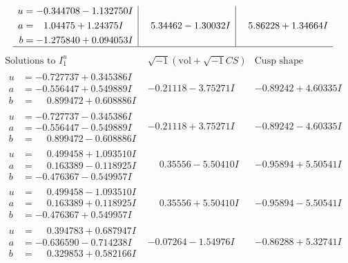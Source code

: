 \documentclass[1p]{elsarticle_modified}
\theoremstyle{definition}
\newcommand{\I}{\sqrt{-1}}
\begin{document}
$$\begin{array}{c|c|c}
\begin{aligned}
u &= -0.344708 - 1.132750 I \\
a &= \phantom{-}1.04475 + 1.24375 I \\
b &= -1.275840 + 0.094053 I\end{aligned}
 & \phantom{-}5.34462 - 1.30032 I & \phantom{-}5.86228 + 1.34664 I\\
 \hline 
 \end{array}$$\newpage$$\begin{array}{c|c|c}  
\text{Solutions to }I^u_{1}& \I (\text{vol} + \sqrt{-1}CS) & \text{Cusp shape}\\
 \hline 
\begin{aligned}
u &= -0.727737 + 0.345386 I \\
a &= -0.556447 + 0.549889 I \\
b &= \phantom{-}0.899472 + 0.608886 I\end{aligned}
 & -0.21118 - 3.75271 I & -0.89242 + 4.60335 I \\ \hline\begin{aligned}
u &= -0.727737 - 0.345386 I \\
a &= -0.556447 - 0.549889 I \\
b &= \phantom{-}0.899472 - 0.608886 I\end{aligned}
 & -0.21118 + 3.75271 I & -0.89242 - 4.60335 I \\ \hline\begin{aligned}
u &= \phantom{-}0.499458 + 1.093510 I \\
a &= \phantom{-}0.163389 - 0.118925 I \\
b &= -0.476367 - 0.549957 I\end{aligned}
 & \phantom{-}0.35556 - 5.50410 I & -0.95894 + 5.50541 I \\ \hline\begin{aligned}
u &= \phantom{-}0.499458 - 1.093510 I \\
a &= \phantom{-}0.163389 + 0.118925 I \\
b &= -0.476367 + 0.549957 I\end{aligned}
 & \phantom{-}0.35556 + 5.50410 I & -0.95894 - 5.50541 I \\ \hline\begin{aligned}
u &= \phantom{-}0.394783 + 0.687947 I \\
a &= -0.636590 - 0.714238 I \\
b &= \phantom{-}0.329853 + 0.582166 I\end{aligned}
 & -0.07264 - 1.54976 I & -0.86288 + 5.32741 I \\ \hline\begin{aligned}

\end{aligned}
\end{array}$$
\end{document}
